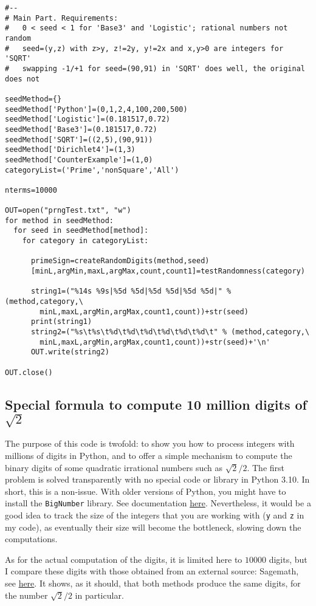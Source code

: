 \documentclass[oneside,10pt]{book}
\begin{document}
\begin{lstlisting}
#--
# Main Part. Requirements:
#   0 < seed < 1 for 'Base3' and 'Logistic'; rational numbers not random
#   seed=(y,z) with z>y, z!=2y, y!=2x and x,y>0 are integers for 'SQRT'
#   swapping -1/+1 for seed=(90,91) in 'SQRT' does well, the original does not

seedMethod={}
seedMethod['Python']=(0,1,2,4,100,200,500)
seedMethod['Logistic']=(0.181517,0.72)
seedMethod['Base3']=(0.181517,0.72)
seedMethod['SQRT']=((2,5),(90,91))
seedMethod['Dirichlet4']=(1,3)
seedMethod['CounterExample']=(1,0)
categoryList=('Prime','nonSquare','All')

nterms=10000

OUT=open("prngTest.txt", "w")
for method in seedMethod:
  for seed in seedMethod[method]:
    for category in categoryList:

      primeSign=createRandomDigits(method,seed)
      [minL,argMin,maxL,argMax,count,count1]=testRandomness(category)

      string1=("%14s %9s|%5d %5d|%5d %5d|%5d %5d|" % (method,category,\
        minL,maxL,argMin,argMax,count1,count))+str(seed)
      print(string1)
      string2=("%s\t%s\t%d\t%d\t%d\t%d\t%d\t%d\t" % (method,category,\
        minL,maxL,argMin,argMax,count1,count))+str(seed)+'\n'
      OUT.write(string2)

OUT.close()
\end{lstlisting}

\subsection{Special formula to compute 10 million digits of $\sqrt{2}$}\label{zw23}

The purpose of this code is twofold: to show you how to process integers with millions of digits in Python, and to offer a simple mechanism to compute the binary digits of some quadratic irrational numbers such as $\sqrt{2}/2$. The first problem is solved transparently with no special code or library
 in Python 3.10. In short, this is a non-issue. With older versions of Python, you might have to install the \texttt{BigNumber} library. See
 documentation \href{https://pypi.org/project/BigNumber/}{here}. Nevertheless, it would be a good idea to track the size of the integers that you are working with (\texttt{y} and \texttt{z} in my code), as eventually their size will become the bottleneck, slowing down the computations.

As for the actual computation of the digits, it is limited here to $\num{10000}$ digits, but I compare these digits with those obtained from an external source: Sagemath, see \href{https://mltblog.com/3uMZQ4s}{here}.  It shows, as it should, that both methods produce the same digits, for the number
 $\sqrt{2}/2$ in particular.
\end{document}
